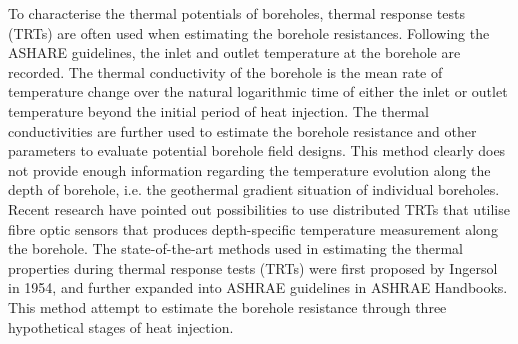 
To characterise the thermal potentials of boreholes, thermal response tests (TRTs) are often used when estimating the borehole resistances. Following the ASHARE guidelines, the inlet and outlet temperature at the borehole are recorded. The thermal conductivity of the borehole is the mean rate of temperature change over the natural logarithmic time of either the inlet or outlet temperature beyond the initial period of heat injection. The thermal conductivities are further used to estimate the borehole resistance and other parameters to evaluate potential borehole field designs. This method clearly does not provide enough information regarding the temperature evolution along the depth of borehole, i.e. the geothermal gradient situation of individual boreholes. Recent research have pointed out possibilities to use distributed TRTs that utilise fibre optic sensors that produces depth-specific temperature measurement along the borehole.  
The state-of-the-art methods used in estimating the thermal properties during thermal response tests (TRTs) were first proposed by Ingersol in 1954, and further expanded into ASHRAE guidelines in ASHRAE Handbooks. This method attempt to estimate the borehole resistance through three hypothetical stages of heat injection.  